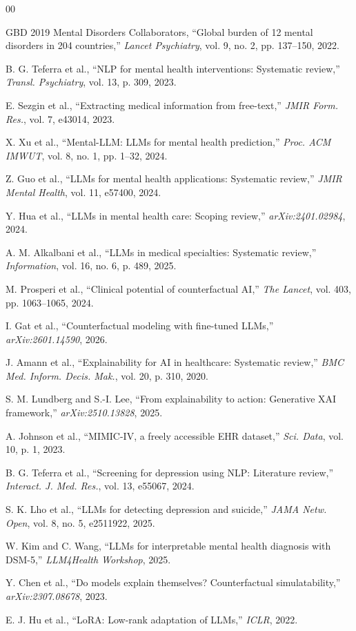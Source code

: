 \documentclass[conference]{IEEEtran}
\begin{document}
\begin{thebibliography}{00}

 GBD 2019 Mental Disorders Collaborators, ``Global burden of 12 mental disorders in 204 countries,'' \textit{Lancet Psychiatry}, vol. 9, no. 2, pp. 137--150, 2022.

 B. G. Teferra et al., ``NLP for mental health interventions: Systematic review,'' \textit{Transl. Psychiatry}, vol. 13, p. 309, 2023.

 E. Sezgin et al., ``Extracting medical information from free-text,'' \textit{JMIR Form. Res.}, vol. 7, e43014, 2023.

 X. Xu et al., ``Mental-LLM: LLMs for mental health prediction,'' \textit{Proc. ACM IMWUT}, vol. 8, no. 1, pp. 1--32, 2024.

 Z. Guo et al., ``LLMs for mental health applications: Systematic review,'' \textit{JMIR Mental Health}, vol. 11, e57400, 2024.

 Y. Hua et al., ``LLMs in mental health care: Scoping review,'' \textit{arXiv:2401.02984}, 2024.

 A. M. Alkalbani et al., ``LLMs in medical specialties: Systematic review,'' \textit{Information}, vol. 16, no. 6, p. 489, 2025.

 M. Prosperi et al., ``Clinical potential of counterfactual AI,'' \textit{The Lancet}, vol. 403, pp. 1063--1065, 2024.

 I. Gat et al., ``Counterfactual modeling with fine-tuned LLMs,'' \textit{arXiv:2601.14590}, 2026.

 J. Amann et al., ``Explainability for AI in healthcare: Systematic review,'' \textit{BMC Med. Inform. Decis. Mak.}, vol. 20, p. 310, 2020.

 S. M. Lundberg and S.-I. Lee, ``From explainability to action: Generative XAI framework,'' \textit{arXiv:2510.13828}, 2025.

 A. Johnson et al., ``MIMIC-IV, a freely accessible EHR dataset,'' \textit{Sci. Data}, vol. 10, p. 1, 2023.

 B. G. Teferra et al., ``Screening for depression using NLP: Literature review,'' \textit{Interact. J. Med. Res.}, vol. 13, e55067, 2024.

 S. K. Lho et al., ``LLMs for detecting depression and suicide,'' \textit{JAMA Netw. Open}, vol. 8, no. 5, e2511922, 2025.

 W. Kim and C. Wang, ``LLMs for interpretable mental health diagnosis with DSM-5,'' \textit{LLM4Health Workshop}, 2025.

 Y. Chen et al., ``Do models explain themselves? Counterfactual simulatability,'' \textit{arXiv:2307.08678}, 2023.

 E. J. Hu et al., ``LoRA: Low-rank adaptation of LLMs,'' \textit{ICLR}, 2022.

\end{thebibliography}
\end{document}

